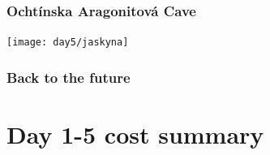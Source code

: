 \documentclass{beamer}
\begin{document}
	\begin{frame}
		\frametitle{Ochtínska Aragonitová Cave}
		
		\texttt{[image: day5/jaskyna]}
	\end{frame}

	\begin{frame}
		\frametitle{Back to the future}

	\end{frame}

	\section{Day 1-5 cost summary}
\end{document}
